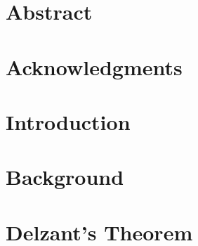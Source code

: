 \documentclass[12pt, oneside]{book}
\begin{document}
\chapter{Abstract}

\newpage 


\chapter{Acknowledgments}


\tableofcontents

\listoffigures

\mainmatter


\chapter{Introduction}


\chapter{Background}


\chapter{Delzant's Theorem}

\end{document}
